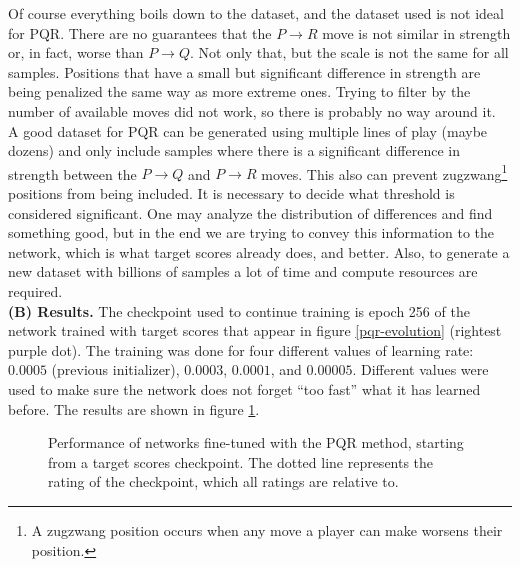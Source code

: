 Of course everything boils down to the dataset, and the dataset used is not ideal for PQR. There are no guarantees that the $P \rightarrow R$ move is not similar in strength or, in fact, worse than $P \rightarrow Q$. Not only that, but the scale is not the same for all samples. Positions that have a small but significant difference in strength are being penalized the same way as more extreme ones. Trying to filter by the number of available moves did not work, so there is probably no way around it. \\

A good dataset for PQR can be generated using multiple lines of play (maybe dozens) and only include samples where there is a significant difference in strength between the $P \rightarrow Q$ and $P \rightarrow R$ moves. This also can prevent zugzwang\footnote{A zugzwang position occurs when any move a player can make worsens their position.} positions from being included. It is necessary to decide what threshold is considered significant. One may analyze the distribution of differences and find something good, but in the end we are trying to convey this information to the network, which is what target scores already does, and better. Also, to generate a new dataset with billions of samples a lot of time and compute resources are required. \\

\textbf{(B) Results.} The checkpoint used to continue training is epoch 256 of the network trained with target scores that appear in figure \ref{pqr-evolution} (rightest purple dot). The training was done for four different values of learning rate: $0.0005$ (previous initializer), $0.0003$, $0.0001$, and $0.00005$. Different values were used to make sure the network does not forget \enquote{too fast} what it has learned before. The results are shown in figure \ref{pqr-ckp}.

\begin{figure}[H]
\centering
{}
\caption{Performance of networks fine-tuned with the PQR method, starting from a target scores checkpoint. The dotted line represents the rating of the checkpoint, which all ratings are relative to.}
\label{pqr-ckp}
\end{figure}

